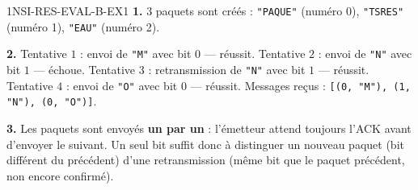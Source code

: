 \begin{corrige}{1NSI-RES-EVAL-B-EX1}
\textbf{1.} $3$ paquets sont créés : \lstinline{"PAQUE"} (numéro 0), \lstinline{"TSRES"}
(numéro 1), \lstinline{"EAU"} (numéro 2).

\textbf{2.} Tentative $1$ : envoi de \lstinline{"M"} avec bit $0$ — réussit. Tentative
$2$ : envoi de \lstinline{"N"} avec bit $1$ — échoue. Tentative $3$ : retransmission de
\lstinline{"N"} avec bit $1$ — réussit. Tentative $4$ : envoi de \lstinline{"O"} avec bit
$0$ — réussit. Messages reçus : \lstinline{[(0, "M"), (1, "N"), (0, "O")]}.

\textbf{3.} Les paquets sont envoyés \textbf{un par un} : l'émetteur attend toujours l'ACK
avant d'envoyer le suivant. Un seul bit suffit donc à distinguer \og un nouveau paquet \fg{}
(bit différent du précédent) d'\og une retransmission \fg{} (même bit que le paquet
précédent, non encore confirmé).
\end{corrige}

